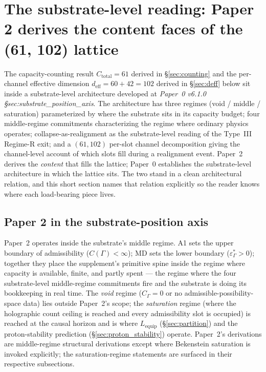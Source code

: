 \documentclass[11pt]{article}
\begin{document}
\section{The substrate-level reading: Paper 2 derives the content faces of the (61, 102) lattice}\label{sec:substrate-level-reading}

The capacity-counting result $C_{\mathrm{total}} = 61$ derived in \S\ref{sec:counting} and the per-channel effective dimension $d_{\mathrm{eff}} = 60 + 42 = 102$ derived in \S\ref{sec:deff} below sit inside a substrate-level architecture developed at \emph{Paper~0 v6.1.0 \S sec:substrate\_position\_axis}. The architecture has three regimes (void / middle / saturation) parameterized by where the substrate sits in its capacity budget; four middle-regime commitments characterizing the regime where ordinary physics operates; collapse-as-realignment as the substrate-level reading of the Type~III Regime-R exit; and a $(61, 102)$ per-slot channel decomposition giving the channel-level account of which slots fill during a realignment event. Paper~2 derives the \emph{content} that fills the lattice; Paper~0 establishes the substrate-level architecture in which the lattice sits. The two stand in a clean architectural relation, and this short section names that relation explicitly so the reader knows where each load-bearing piece lives.

\subsection{Paper 2 in the substrate-position axis}\label{sec:substrate-level-reading-position}

Paper~2 operates inside the substrate's middle regime. A1 sets the upper boundary of admissibility ($C(\Gamma) < \infty$); MD sets the lower boundary ($\varepsilon^*_\Gamma > 0$); together they place the supplement's primitive spine inside the regime where capacity is available, finite, and partly spent --- the regime where the four substrate-level middle-regime commitments fire and the substrate is doing its bookkeeping in real time. The \emph{void} regime ($C_\Gamma = 0$ or no admissible-possibility-space data) lies outside Paper~2's scope; the \emph{saturation} regime (where the holographic count ceiling is reached and every admissibility slot is occupied) is reached at the causal horizon and is where $L_{\mathrm{equip}}$ (\S\ref{sec:partition}) and the proton-stability prediction (\S\ref{sec:proton_stability}) operate. Paper~2's derivations are middle-regime structural derivations except where Bekenstein saturation is invoked explicitly; the saturation-regime statements are surfaced in their respective subsections.
\end{document}
